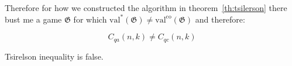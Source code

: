 Therefore for how we constructed the algorithm in theorem~\ref{th:tsilerson} there bust me a game $\mathfrak{G}$ for which $\operatorname{val^{*}}(\mathfrak{G}) \neq  \operatorname{val^{co}}(\mathfrak{G})$ and therefore:

\begin{theorem}
    \begin{equation}
    C_{q a}(n, k) \neq C_{q c}(n, k)
    \end{equation}
\end{theorem}

Tsirelson inequality is false.




